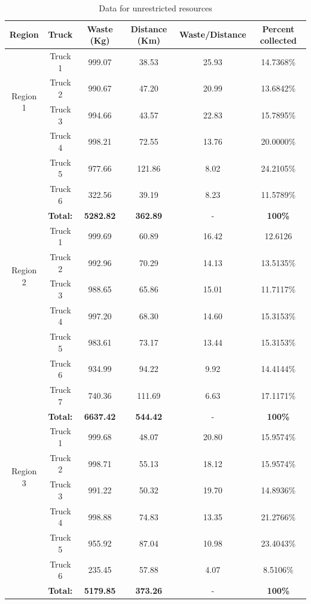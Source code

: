 \documentclass[12pt]{article}
\begin{document}
\begin{table}[H]
    \centering
    \caption{ Data for unrestricted resources} \label{tab3}
    \vspace*{0.3cm}
    \begin{tabular}{|c|c|c|c|c|c|}
        \hline Region & Truck & Waste (Kg) & Distance (Km) & Waste/Distance & Percent collected \\
        \hline \multirow{4}{*}{Region 1} & Truck 1 & 999.07& 38.53 & 25.93 &14.7368\% \\
        \cline{2-6}& Truck 2 & 990.67 & 47.20 & 20.99 & 13.6842\%\\        
        \cline{2-6}& Truck 3 & 994.66 & 43.57 & 22.83 & 15.7895\%\\        
        \cline{2-6}& Truck 4 & 998.21 & 72.55 & 13.76 & 20.0000\%\\      
        \cline{2-6}& Truck 5 & 977.66 & 121.86 & 8.02 & 24.2105\%\\      
        \cline{2-6}& Truck 6 & 322.56 & 39.19 & 8.23 & 11.5789\%\\ 
        \hline &\textbf{Total:} &\textbf{5282.82} &\textbf{362.89} &- &\textbf{100\%}\\
        \hline \multirow{4}{*}{Region 2} & Truck 1 & 999.69 & 60.89 & 16.42 & 12.6126 \\
        \cline{2-6}& Truck 2 & 992.96 & 70.29 & 14.13 & 13.5135\%\\        
        \cline{2-6}& Truck 3 & 988.65 & 65.86 & 15.01 & 11.7117\%\\        
        \cline{2-6}& Truck 4 & 997.20 & 68.30 & 14.60 & 15.3153\%\\      
        \cline{2-6}& Truck 5 & 983.61 & 73.17 & 13.44 & 15.3153\%\\      
        \cline{2-6}& Truck 6 & 934.99 & 94.22 & 9.92 & 14.4144\%\\      
        \cline{2-6}& Truck 7 & 740.36 & 111.69 & 6.63 & 17.1171\%\\
        \hline &\textbf{Total:} &\textbf{6637.42} &\textbf{544.42} &- &\textbf{100\%}\\     
        \hline \multirow{4}{*}{Region 3} & Truck 1 & 999.68 & 48.07 & 20.80 & 15.9574\% \\
		\cline{2-6}& Truck 2 & 998.71 & 55.13 & 18.12 & 15.9574\%\\        
		\cline{2-6}& Truck 3 & 991.22 & 50.32 & 19.70 & 14.8936\%\\        
		\cline{2-6}& Truck 4 & 998.88 & 74.83 & 13.35 & 21.2766\%\\      
		\cline{2-6}& Truck 5 & 955.92 & 87.04 & 10.98 & 23.4043\%\\      
		\cline{2-6}& Truck 6 & 235.45 & 57.88 & 4.07 & 8.5106\%\\ 
        \hline &\textbf{Total:} &\textbf{5179.85} &\textbf{373.26 }&- &\textbf{100\%}\\
        \hline      
    \end{tabular}
\end{table}
\end{document}
